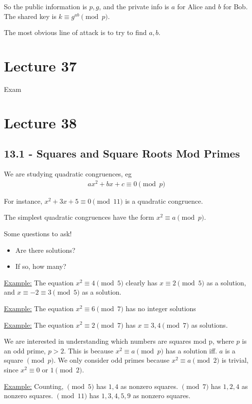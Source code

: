 \documentclass{article}
\begin{document}
So the public information is $p,g$, and the private info is $a$ for Alice and $b$ for Bob. The shared key is $k\equiv g^{ab}\pmod p$.

The most obvious line of attack is to try to find $a,b$. 

\section{Lecture 37}

Exam 

\section{Lecture 38}

\subsection{13.1 - Squares and Square Roots Mod Primes}

We are studying quadratic congruences, eg \begin{align*}
    ax^2+bx+c\equiv 0\pmod p
\end{align*}

For instance, $x^2+3x+5\equiv 0\pmod{11}$ is a quadratic congruence. 

The simplest quadratic congruences have the form $x^2\equiv a\pmod p$.

Some questions to ask! \begin{itemize}
    \item Are there solutions? 
    \item If so, how many? 
\end{itemize}

\underline{Example:} The equation $x^2\equiv 4\pmod 5$ clearly has $x\equiv 2\pmod 5$ as a solution, and $x\equiv -2\equiv 3\pmod 5$ as a solution. 

\underline{Example:} The equation $x^2\equiv 6\pmod 7$ has no integer solutions 

\underline{Example:} The equation $x^2\equiv 2\pmod 7$ has $x\equiv 3, 4\pmod 7$ as solutions. 

We are interested in understanding which numbers are squares mod p, where $p$ is an odd prime, $p>2$. This is because $x^2\equiv a\pmod p$ has a solution iff. $a$ is a square $\pmod p$. We only consider odd primes because $x^2\equiv a\pmod 2$ is trivial, since $x^2\equiv 0\text{ or }1\pmod 2$.

\underline{Example:} Counting, $\pmod 5$ has $1,4$ as nonzero squares. $\pmod 7$ has $1,2,4$ as nonzero squares. $\pmod{11}$ has $1,3,4,5,9$ as nonzero squares. 
\end{document}
